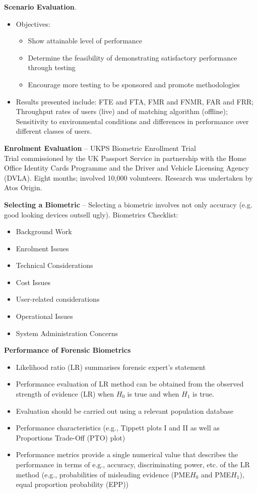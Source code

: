 \documentclass[a4paper]{article}
\begin{document}
      \textbf{Scenario Evaluation}.
      \begin{itemize}
        \item Objectives:
        \begin{itemize}
          \item Show attainable level of performance
          \item Determine the feasibility of demonstrating satisfactory performance through testing
          \item Encourage more testing to be sponsored and promote methodologies
        \end{itemize}
        \item Results presented include: FTE and FTA, FMR and FNMR, FAR and FRR; Throughput rates of users (live) and of matching algorithm (offline); Sensitivity to environmental conditions and differences in performance over different classes of users.
      \end{itemize}

      \textbf{Enrolment Evaluation} -- UKPS Biometric Enrollment Trial\\
      Trial commissioned by the UK Passport Service in partnership with the Home Office Identity Cards Programme and the Driver and Vehicle Licensing Agency (DVLA). Eight months; involved 10,000 volunteers. Research was undertaken by Atos Origin.

      \textbf{Selecting a Biometric} -- Selecting a biometric involves not only accuracy (e.g. good looking devices outsell ugly). Biometrics Checklist:
      \begin{itemize}
        \item Background Work
        \item Enrolment Issues
        \item Technical Considerations
        \item Cost Issues
        \item User-related considerations
        \item Operational Issues
        \item System Administration Concerns
      \end{itemize}

      \textbf{Performance of Forensic Biometrics}
      \begin{itemize}
        \item Likelihood ratio (LR) summarises forensic expert's statement
        \item Performance evaluation of LR method can be obtained from the observed strength of evidence (LR) when $H_0$ is true and when $H_1$ is true.
        \item Evaluation should be carried out using a relevant population database
        \item Performance characteristics (e.g., Tippett plots I and II as well as Proportions Trade-Off (PTO) plot)
        \item Performance metrics provide a single numerical value that describes the performance in terms of e.g., accuracy, discriminating power, etc. of the LR method (e.g., probabilities of misleading evidence (PME$H_0$ and PME$H_1$), equal proportion probability (EPP))
      \end{itemize}
    \newpage
\end{document}
